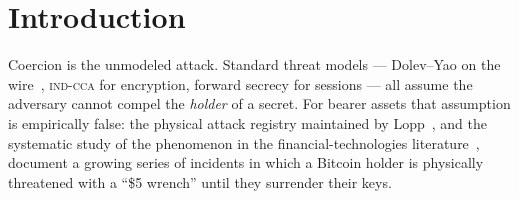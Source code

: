 \section{Introduction}

Coercion is the unmodeled attack. Standard threat models --- Dolev--Yao on the
wire~\cite{dolev-yao}, \textsc{ind-cca} for encryption, forward secrecy for
sessions --- all assume the adversary cannot compel the \emph{holder} of a
secret. For bearer assets that assumption is empirically false: the physical
attack registry maintained by Lopp~\cite{lopp-attacks}, and the systematic
study of the phenomenon in the financial-technologies literature~\cite{aft-wrench},
document a growing series of incidents in which a Bitcoin holder is physically
threatened with a ``\$5 wrench'' until they surrender their keys.

